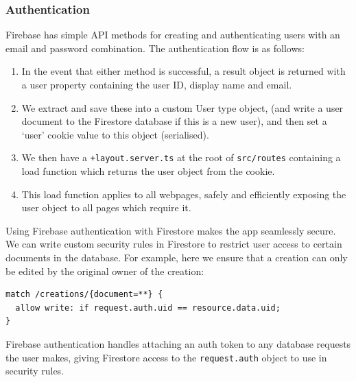 \documentclass[12pt,a4paper]{article}
\begin{document}
\subsubsection{Authentication}
Firebase has simple API methods for creating and authenticating users with an email and password combination. The authentication flow is as follows:
\begin{enumerate}
    \item In the event that either method is successful, a result object is returned with a user property containing the user ID, display name and email.
    \item We extract and save these into a custom User type object, (and write a user document to the Firestore database if this is a new user), and then set a `user' cookie value to this object (serialised).
    \item We then have a \verb|+layout.server.ts| at the root of \verb|src/routes| containing a load function which returns the user object from the cookie.
    \item  This load function applies to all webpages, safely and efficiently exposing the user object to all pages which require it.
\end{enumerate}
Using Firebase authentication with Firestore makes the app seamlessly secure. We can write custom security rules in Firestore to restrict user access to certain documents in the database. For example, here we ensure that a creation can only be edited by the original owner of the creation:
\begin{lstlisting}
match /creations/{document=**} {
  allow write: if request.auth.uid == resource.data.uid;
}
\end{lstlisting}
Firebase authentication handles attaching an auth token to any database requests the user makes, giving Firestore access to the \verb|request.auth| object to use in security rules.
\end{document}
